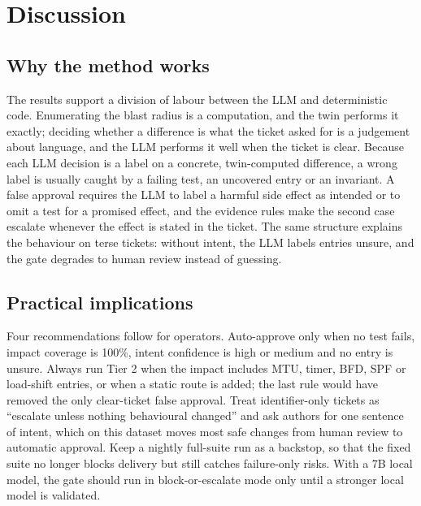 \documentclass[pdflatex,iicol,sn-mathphys-num]{sn-jnl}%
\theoremstyle{thmstyletwo}%
\begin{document}
\section{Discussion}\label{sec:discussion}

\subsection{Why the method works}\label{sec:why}

The results support a division of labour between the LLM and deterministic code. Enumerating the blast radius is a computation, and the twin performs it exactly; deciding whether a difference is what the ticket asked for is a judgement about language, and the LLM performs it well when the ticket is clear. Because each LLM decision is a label on a concrete, twin-computed difference, a wrong label is usually caught by a failing test, an uncovered entry or an invariant. A false approval requires the LLM to label a harmful side effect as intended or to omit a test for a promised effect, and the evidence rules make the second case escalate whenever the effect is stated in the ticket. The same structure explains the behaviour on terse tickets: without intent, the LLM labels entries unsure, and the gate degrades to human review instead of guessing.

\subsection{Practical implications}\label{sec:implications}

Four recommendations follow for operators. Auto-approve only when no test fails, impact coverage is 100\%, intent confidence is high or medium and no entry is unsure. Always run Tier 2 when the impact includes MTU, timer, BFD, SPF or load-shift entries, or when a static route is added; the last rule would have removed the only clear-ticket false approval. Treat identifier-only tickets as ``escalate unless nothing behavioural changed'' and ask authors for one sentence of intent, which on this dataset moves most safe changes from human review to automatic approval. Keep a nightly full-suite run as a backstop, so that the fixed suite no longer blocks delivery but still catches failure-only risks. With a 7B local model, the gate should run in block-or-escalate mode only until a stronger local model is validated.
\end{document}
